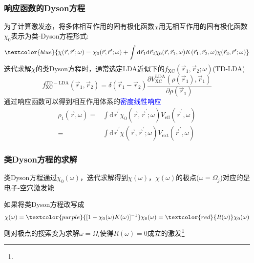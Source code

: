 {\frame
{
	\frametitle{响应函数的\textrm{Dyson}方程}
	为了计算激发态，将多体相互作用的固有极化函数$\chi$用无相互作用的固有极化函数$\chi_0$表示为类-\textrm{Dyson}方程形式:
\begin{displaymath}
	\textcolor{blue}{\chi(\vec r,\vec r^{\prime};\omega)=\chi_0(\vec r,\vec r^{\prime};\omega)+\int\mathrm{d}\vec r_1\mathrm{d}\vec r_2\chi_0(\vec r,\vec r_1,\omega)K(\vec r_1,\vec r_2,\omega)\chi(\vec r_2,\vec r^{\prime};\omega)}
\end{displaymath}
{\fontsize{7.8pt}{4.2pt}}
迭代求解$\chi$的类\textrm{Dyson}方程时，通常选定\textrm{LDA}近似下的$f_{\mathrm{XC}}(\vec r_1,\vec r_2;\omega)$(\textrm{TD-LDA})
\begin{displaymath}
	f_{\mathrm{XC}}^{\mathrm{TD-LDA}}(\vec r_1,\vec r_2)=\delta(\vec r_1-\vec r_2)\frac{\partial V_{\mathrm{XC}}^{\mathrm{LDA}}(\rho(\vec r_1),\vec r_1)}{\partial\rho(\vec r_1)}
\end{displaymath}
通过响应函数可以得到相互作用体系的\textcolor{blue}{密度线性响应}
\begin{displaymath}
	\begin{aligned}
		\rho_1(\vec r,\omega)=&\int\mathrm{d}\vec r^{\prime}\chi_0(\vec r,\vec r^{\prime};\omega)V_{\mathrm{eff}}(\vec r^{\prime},\omega)\\
	\equiv&\int\mathrm{d}\vec r^{\prime}\chi(\vec r,\vec r^{\prime};\omega)V_{\mathrm{ext}}(\vec r^{\prime},\omega)
	\end{aligned}
\end{displaymath}
}

\frame
{
	\frametitle{类\textrm{Dyson}方程的求解}
	类\textrm{Dyson}方程通过$\chi_0(\omega)$，迭代求解得到$\chi(\omega)$，$\chi(\omega)$的极点($\omega=\Omega_j$)对应的是电子-空穴激发能

	如果将类\textrm{Dyson}方程改写成
	\begin{displaymath}
		\chi(\omega)=\textcolor{purple}{[1-\chi_0(\omega)K(\omega)]^{-1}}\chi_0(\omega)=\textcolor{red}{R(\omega)}\chi_0(\omega)
	\end{displaymath}
	则对极点的搜索变为求解$\omega=\Omega_i$使得$R(\omega)=0$成立的激发\footnote{\fontsize{5.8pt}{4.2pt}}

}}
